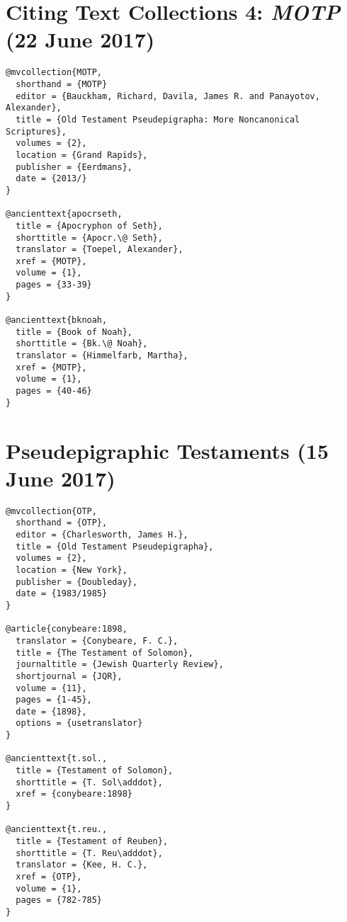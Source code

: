 \documentclass[a4paper]{article}
\renewcommand\footnote[1]{##1}%
\begin{document}
\section{Citing Text Collections 4: \emph{MOTP} (22 June 2017)}

\begin{verbatim}
@mvcollection{MOTP,
  shorthand = {MOTP}
  editor = {Bauckham, Richard, Davila, James R. and Panayotov, Alexander},
  title = {Old Testament Pseudepigrapha: More Noncanonical Scriptures},
  volumes = {2},
  location = {Grand Rapids},
  publisher = {Eerdmans},
  date = {2013/}
}

@ancienttext{apocrseth,
  title = {Apocryphon of Seth},
  shorttitle = {Apocr.\@ Seth},
  translator = {Toepel, Alexander},
  xref = {MOTP},
  volume = {1},
  pages = {33-39}
}

@ancienttext{bknoah,
  title = {Book of Noah},
  shorttitle = {Bk.\@ Noah},
  translator = {Himmelfarb, Martha},
  xref = {MOTP},
  volume = {1},
  pages = {40-46}
}
\end{verbatim}

\exampleancientsources
\examplesecondarysources
{}

\section{Pseudepigraphic Testaments (15 June 2017)}

\begin{verbatim}
@mvcollection{OTP,
  shorthand = {OTP},
  editor = {Charlesworth, James H.},
  title = {Old Testament Pseudepigrapha},
  volumes = {2},
  location = {New York},
  publisher = {Doubleday},
  date = {1983/1985}
}

@article{conybeare:1898,
  translator = {Conybeare, F. C.},
  title = {The Testament of Solomon},
  journaltitle = {Jewish Quarterly Review},
  shortjournal = {JQR},
  volume = {11},
  pages = {1-45},
  date = {1898},
  options = {usetranslator}
}

@ancienttext{t.sol.,
  title = {Testament of Solomon},
  shorttitle = {T. Sol\adddot},
  xref = {conybeare:1898}
}

@ancienttext{t.reu.,
  title = {Testament of Reuben},
  shorttitle = {T. Reu\adddot},
  translator = {Kee, H. C.},
  xref = {OTP},
  volume = {1},
  pages = {782-785}
}
\end{verbatim}
\end{document}
